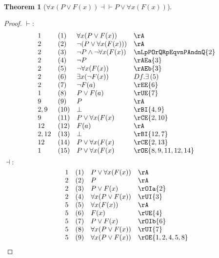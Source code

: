 \documentclass{book}
\theoremstyle{plain}
\newtheorem{theorem}{Theorem}
\theoremstyle{remark}
\theoremstyle{definition}
\begin{document}
\label{FaxLpPOrFLpxRpRpEqvPOrFaxLpFLpxRpRp}
\begin{theorem}[\(\forall x(P \lor F(x)) \dashv \vdash P \lor \forall x(F(x))\)]
\end{theorem}
\begin{proof}
	\(\vdash:\)
	\[
	\begin{array}{llll}
		1 & (1) & \forall x(P \lor F(x)) & \rA \\
		2 & (2) & \neg(P \lor \forall x(F(x))) & \rA \\
		2 & (3) & \neg P \land \neg \forall x(F(x)) & \nLpPOrQRpEqvnPAndnQ{2} \\			
		2 & (4) & \neg P & \rAEa{3} \\
		2 & (5) & \neg \forall x(F(x)) & \rAEb{3} \\
		2 & (6) & \exists x(\neg F(x)) & Df. \exists\, (5) \\
		2 & (7) & \neg F(a) & \rEE{6} \\
		1 & (8) & P\lor F(a) & \rUE{7} \\
		9 & (9) & P & \rA \\
		2,9 & (10) & \bot & \rBI{4,9} \\
		9 & (11) & P \lor \forall x(F(x) & \rCE{2,10} \\
		12 & (12) & F(a) & \rA \\
		2,12 & (13) & \bot & \rBI{12,7} \\
		12 & (14) & P \lor \forall x(F(x) & \rCE{2,13} \\
		1 & (15) & P \lor \forall x(F(x) & \rOE{8,9,11,12,14} \\
	\end{array}
	\]
	\(\dashv:\)
	\[
	\begin{array}{llll}
		1 & (1) & P \lor \forall x(F(x)) & \rA \\
		2 & (2) & P & \rA \\
		2 & (3) & P\lor F(x) & \rOIa{2} \\
		2 & (4) & \forall x(P\lor F(x)) & \rUI{3} \\
		5 & (5) & \forall x(F(x)) & \rA \\
		5 & (6) & F(x) & \rUE{4} \\
		5 & (7) & P\lor F(x) & \rOIb{6} \\
		5 & (8) & \forall x(P\lor F(x)) & \rUI{7} \\
		5 & (9) & \forall x(P\lor F(x)) & \rOE{1,2,4,5,8} \\
	\end{array}
	\]
\end{proof}
\end{document}
